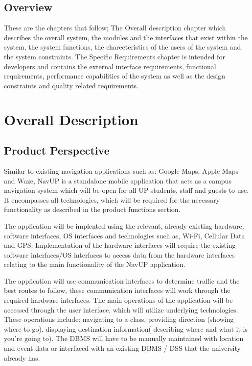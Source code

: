 \documentclass[11pt, a4paper]{article}
\begin{document}
	\subsection{Overview}
		These are the chapters that follow; The Overall description chapter which describes the overall system,  the modules and the interfaces that exist within the system,  the system functions,  the charecteristics of the users of the system and the system constraints. The Specific Requirements chapter is intended for developers and contains the external interface requirements,  			functional requirements,  performance capabilities of the system as well as the design constraints and quality related requirements.

\newpage
\section{Overall Description}
	\subsection{Product Perspective}
	Similar to existing navigation applications such as: Google Maps,  Apple Maps and Waze,  NavUP is a standalone mobile application that acts as a campus navigation system which will be open for all UP students,  staff and guests to use. It encompasses all technologies,  which will be required for the necessary functionality as described in the product functions section. 
	\\
	\par
The application will be implented using the relevant,   already existing hardware,   software interfaces,  OS interfaces and technologies such as,  Wi-Fi,  Cellular Data and GPS. Implementation of the hardware interfaces will require the  existing software interfaces/OS interfaces to access data from the hardware interfaces relating to the main functionality of the NavUP application. 
	\\
	\par
The application will use communication interfaces to determine traffic and the best routes to follow,  these communication interfaces will work through the required hardware interfaces. The main operations of the application will be accessed through the user interface,  which will utilize underlying  technologies. These operations include: navigating to a class,   providing direction (showing where to go), displaying destination information( describing where and what it is you're going to). The DBMS will have to be manually maintained with location and event data or interfaced with an existing DBMS / DSS that the university already has. 
\end{document}
